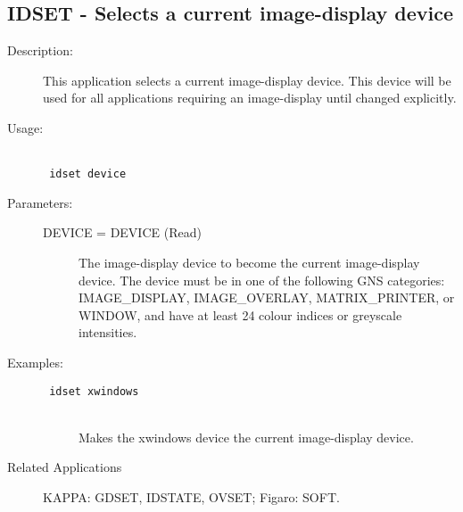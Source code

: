 \documentclass[twoside,11pt]{article}
\newcommand{\stardocinitials}  {SUN}
\newcommand{\stardocnumber}    {239.2}
\newcommand{\stardocname}{\stardocinitials /\stardocnumber}
\newcommand{\htmlref}[2]{#1}
\newcommand{\xlabel}[1]{}
\newlength{\sstbannerlength}
\newlength{\sstcaptionlength}
\newlength{\sstexampleslength}
\newlength{\sstexampleswidth}
\newcommand{\sstroutine}[3]{
   \goodbreak
   \markboth{{\stardocname}~ --- #1}{{\stardocname}~ --- #1}
   \rule{\textwidth}{0.5mm}
   \vspace{-7ex}
   \newline
   \settowidth{\sstbannerlength}{{\Large {\bf #1}}}
   \setlength{\sstcaptionlength}{\textwidth}
   \setlength{\sstexampleslength}{\textwidth}
   \addtolength{\sstbannerlength}{0.5em}
   \addtolength{\sstcaptionlength}{-2.0\sstbannerlength}
   \addtolength{\sstcaptionlength}{-4.9pt}
   \settowidth{\sstexampleswidth}{{\bf Examples:}}
   \addtolength{\sstexampleslength}{-\sstexampleswidth}
   \parbox[t]{\sstbannerlength}{\flushleft{\Large {\bf #1}}}
   \parbox[t]{\sstcaptionlength}{\center{\Large #2}}
   \parbox[t]{\sstbannerlength}{\flushright{\Large {\bf #1}}}
   \begin{description}
      #3
   \end{description}
}
\newcommand{\sstdescription}[1]{\item[Description:] #1}
\newcommand{\sstusage}[1]{\pagebreak[3] \item[Usage:] \mbox{} \\[1.3ex] {\ssttt #1}}
\newcommand{\sstparameters}[1]{
   \goodbreak 
   \item[Parameters:] \mbox{} \\
   \vspace{-3.5ex}
   \begin{description}
      #1
   \end{description}
}
\newcommand{\sstexamples}[1]{
   \goodbreak
   \item[Examples:] \mbox{} \\
   \vspace{-3.5ex}
   \begin{description}
      #1
   \end{description}
}
\newcommand{\sstsubsection}[1]{ \item[{#1}] \mbox{} \\}
\newcommand{\sstexamplesubsection}[2]{\sloppy \item{\ssttt #1} \mbox{} \\ #2 }
\newcommand{\sstdiytopic}[2]{\goodbreak \item[{\hspace{-0.35em}#1\hspace{-0.35em}:}] \mbox{} \\[1.3ex] #2}
\newcommand{\ssttt}{\tt}
\renewcommand{\sstroutine}[3]{
      \subsection{#1\xlabel{#1}-\label{#1}#2}
      \begin{description}
         #3
      \end{description}
   }
\renewcommand{\sstdescription}[1]{\item[Description:]
      \begin{description}
         #1
      \end{description}
   }
\renewcommand{\sstusage}[1]{\htmlref{\item[Usage:]}{ap:usage} \mbox{} \\ {\ssttt #1}}
\renewcommand{\sstparameters}[1]{
      \htmlref{\item[Parameters:]}{se:param}
      \begin{description}
         #1
      \end{description}
   }
\renewcommand{\sstexamples}[1]{
      \htmlref{\item[Examples:]}{ap:example}
      \begin{description}
         #1
      \end{description}
   }
\renewcommand{\sstsubsection}[1]{\item[{#1}]}
\renewcommand{\sstexamplesubsection}[2]{\item[{\ssttt #1}] \\ #2}
\renewcommand{\sstdiytopic}[2]{\item[{#1}]
      \begin{description}
         #2
      \end{description}
   }
\begin{document}
\sstroutine{
   IDSET
}{
   Selects a current image-display device
}{
   \sstdescription{
      This application selects a current image-display device. This
      device will be used for all applications requiring an
      image-display until changed explicitly.
   }
   \sstusage{
      idset device
   }
   \sstparameters{
      \sstsubsection{
         DEVICE = DEVICE (Read)
      }{
         The image-display device to become the current image-display
         device.  The device must be in one of the following GNS
         categories: IMAGE\_DISPLAY, IMAGE\_OVERLAY, MATRIX\_PRINTER, or
         WINDOW, and have at least 24 colour indices or greyscale
         intensities.
      }
   }
   \sstexamples{
      \sstexamplesubsection{
         idset xwindows
      }{
         Makes the xwindows device the current image-display device.
      }
   }
   \sstdiytopic{
      Related Applications
   }{
      KAPPA: GDSET, IDSTATE, OVSET; Figaro: SOFT.
   }
}
\end{document}
